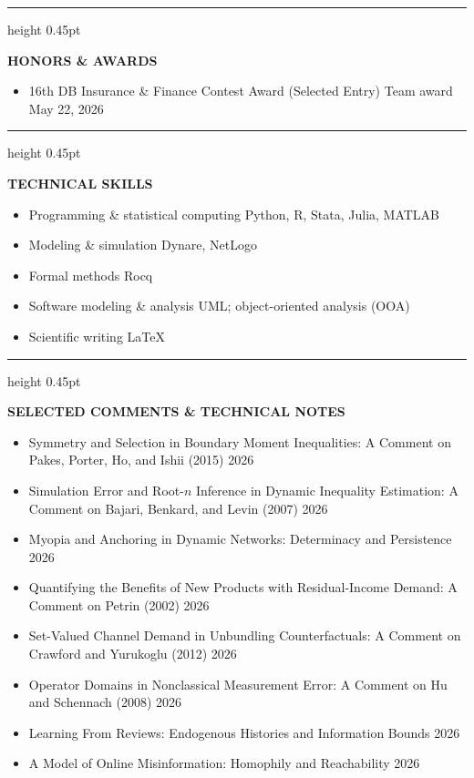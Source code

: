 \documentclass[11pt,letterpaper]{article}
\newcommand{\cvsection}[1]{%
  \par\vspace{0.24in}%
  {\color{cvgray}\hrule height 0.45pt}
  \vspace{0.16in}%
  {\color{cvgray}\fontsize{9.2}{11}\selectfont\bfseries\MakeUppercase{#1}}%
  \par\vspace{0.11in}%
}
\newcommand{\firstcvsection}[1]{%
  \par\vspace{0.11in}%
  {\color{cvgray}\hrule height 0.45pt}
  \vspace{0.16in}%
  {\color{cvgray}\fontsize{9.2}{11}\selectfont\bfseries\MakeUppercase{#1}}%
  \par\vspace{0.09in}%
}
\newenvironment{cvitems}{%
  \begin{itemize}[label={\textcolor{cvgray}{--}},leftmargin=0.28in,labelsep=0.09in,itemsep=0.105in,topsep=0pt,parsep=0pt,partopsep=0pt]
}{\end{itemize}}
\newenvironment{cvtightitems}{%
  \begin{itemize}[label={\textcolor{cvgray}{--}},leftmargin=0.28in,labelsep=0.09in,itemsep=0.110in,topsep=0pt,parsep=0pt,partopsep=0pt]
}{\end{itemize}}
\begin{document}
\cvsection{Honors \& Awards}
\begin{cvitems}
  \item 16th DB Insurance \& Finance Contest \textbullet{} Award (Selected Entry) \textbullet{} Team award \textbullet{} May 22, 2026
\end{cvitems}

\cvsection{Technical Skills}
\begin{cvitems}
  \item Programming \& statistical computing \textbullet{} Python, R, Stata, Julia, MATLAB
  \item Modeling \& simulation \textbullet{} Dynare, NetLogo
  \item Formal methods \textbullet{} Rocq
  \item Software modeling \& analysis \textbullet{} UML; object-oriented analysis (OOA)
  \item Scientific writing \textbullet{} LaTeX
\end{cvitems}

\newpage
\thispagestyle{fancy}

\vspace*{-0.12in}
\firstcvsection{Selected Comments \& Technical Notes}
\begin{cvtightitems}
  \item Symmetry and Selection in Boundary Moment Inequalities: A Comment on Pakes, Porter, Ho, and Ishii (2015) \textbullet{} 2026
  \item Simulation Error and Root-$n$ Inference in Dynamic Inequality Estimation: A Comment on Bajari, Benkard, and Levin (2007) \textbullet{} 2026
  \item Myopia and Anchoring in Dynamic Networks: Determinacy and Persistence \textbullet{} 2026
  \item Quantifying the Benefits of New Products with Residual-Income Demand: A Comment on Petrin (2002) \textbullet{} 2026
  \item Set-Valued Channel Demand in Unbundling Counterfactuals: A Comment on Crawford and Yurukoglu (2012) \textbullet{} 2026
  \item Operator Domains in Nonclassical Measurement Error: A Comment on Hu and Schennach (2008) \textbullet{} 2026
  \item Learning From Reviews: Endogenous Histories and Information Bounds \textbullet{} 2026
  \item A Model of Online Misinformation: Homophily and Reachability \textbullet{} 2026
\end{cvtightitems}
\end{document}
